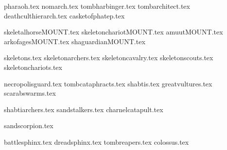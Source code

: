 
{pharaoh.tex}
{nomarch.tex}
{tombharbinger.tex}
{tombarchitect.tex}
{deathculthierarch.tex}
{casketofphatep.tex}

\clearpage
{}
{skeletalhorseMOUNT.tex}
{skeletonchariotMOUNT.tex}
{amuutMOUNT.tex}
{arkofagesMOUNT.tex}
{shaguardianMOUNT.tex}

\clearpage
{}
{skeletons.tex}
{skeletonarchers.tex}
{skeletoncavalry.tex}
{skeletonscouts.tex}
{skeletonchariots.tex}

\clearpage
{}
{necropolisguard.tex}
{tombcataphracts.tex}
{shabtis.tex}
{greatvultures.tex}
{scarabswarms.tex}

\clearpage
{}
{shabtiarchers.tex}
{sandstalkers.tex}
{charnelcatapult.tex}

\vspace{1cm}
{sandscorpion.tex}

\clearpage
{}
{battlesphinx.tex}
{dreadsphinx.tex}
{tombreapers.tex}
{colossus.tex}
